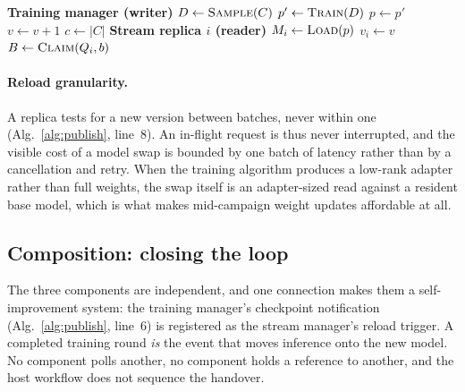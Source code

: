 \begin{algorithm}[t]
\caption{Checkpoint publication and weight synchronization. Top: the training
manager, the single writer of $(p, v)$. Bottom: the loop of one stream replica
$i$, with local version $v_i$. The two run concurrently on different nodes and
synchronize only through $(p, v)$.}
\label{alg:publish}
\begin{algorithmic}[1]
\Statex \textbf{Training manager (writer)}
\State $D \gets \Call{Sample}{C}$ 
\State $p' \gets \Call{Train}{D}$ 
\State $p \gets p'$ 
\State $v \gets v + 1$ 
\State $c \gets |C|$ 
\State {} 
\Statex
\Statex \textbf{Stream replica $i$ (reader)}
   
    \State $M_i \gets \Call{Load}{p}$
    \State $v_i \gets v$
  \EndIf
  \State $B \gets \Call{Claim}{Q_i, b}$ 
  \State {}
\EndWhile
\end{algorithmic}
\end{algorithm}

\paragraph{Reload granularity.}
A replica tests for a new version between batches, never within one
(Alg.~\ref{alg:publish}, line~8). An in-flight request is thus never interrupted,
and the visible cost of a model swap is bounded by one batch of latency rather
than by a cancellation and retry. When the training algorithm produces a
low-rank adapter rather than full weights, the swap itself is an adapter-sized
read against a resident base model, which is what makes mid-campaign weight
updates affordable at all.

\subsection{Composition: closing the loop}
\label{sec:design:loop}

The three components are independent, and one connection makes them a
self-improvement system: the training manager's checkpoint notification
(Alg.~\ref{alg:publish}, line~6) is registered as the stream manager's reload
trigger. A completed training round \emph{is} the event that moves inference
onto the new model. No component polls another, no component holds a reference
to another, and the host workflow does not sequence the handover.

